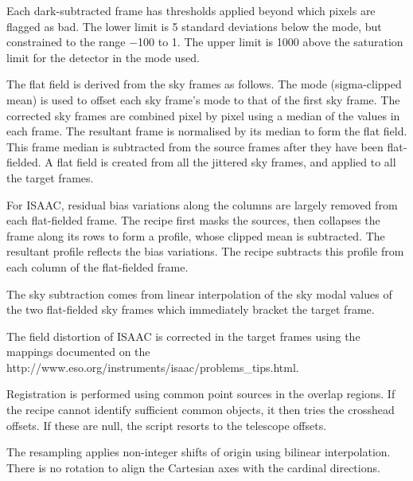 \documentclass[twoside,11pt,nolof]{starlink}
\begin{document}
{{{         \sstitem
         Each dark-subtracted frame has thresholds applied beyond which
         pixels are flagged as bad.  The lower limit is 5 standard
         deviations below the mode, but constrained to the range $-$100 to 1.
         The upper limit is 1000 above the saturation limit for the detector
         in the mode used.

         \sstitem
         The flat field is derived from the sky frames as follows.  The
         mode (sigma-clipped mean) is used to offset each sky frame's mode
         to that of the first sky frame.  The corrected sky frames are
         combined pixel by pixel using a median of the values in each
         frame.  The resultant frame is normalised by its median to form
         the flat field.  This frame median is subtracted from the source
         frames after they have been flat-fielded.  A flat field is created
         from all the jittered sky frames, and applied to all the target
         frames.

         \sstitem
         For ISAAC, residual bias variations along the columns are
         largely removed from each flat-fielded frame.  The recipe first
         masks the sources, then collapses the frame along its rows to form
         a profile, whose clipped mean is subtracted.  The resultant profile
         reflects the bias variations.  The recipe subtracts this profile
         from each column of the flat-fielded frame.

         \sstitem
         The sky subtraction comes from linear interpolation of the sky
         modal values of the two flat-fielded sky frames which immediately
         bracket the target frame.

         \sstitem
         The field distortion of ISAAC is corrected in the target frames
         using the mappings documented on the
         {http://www.eso.org/instruments/isaac/problems_tips.html}.

         \sstitem
         Registration is performed using common point sources in the
         overlap regions.  If the recipe cannot identify sufficient common
         objects, it then tries the crosshead offsets.  If these are null,
         the script resorts to the telescope offsets.

         \sstitem
         The resampling applies non-integer shifts of origin using
         bilinear interpolation.  There is no rotation to align the
         Cartesian axes with the cardinal directions.

}}}
\end{document}
